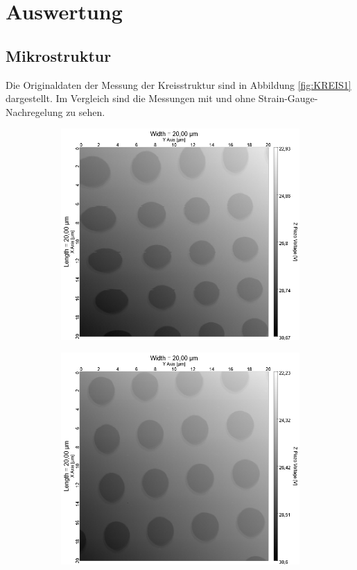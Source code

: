 \newpage
\section{Auswertung}
\label{sec:evaluation}
\subsection{Mikrostruktur}
Die Originaldaten der Messung der Kreisstruktur sind in Abbildung \ref{fig:KREIS1} dargestellt. 
Im Vergleich sind die Messungen mit und ohne Strain-Gauge-Nachregelung zu sehen.

\begin{figure}[H]
    \centering
    \begin{subfigure}{0.49\textwidth}
        \includegraphics[width=\textwidth]{bilder/Mikrostruktur/Kreis2_Res250px_Speed100pps_ohne_Nachregelung_withscale.png}
        \caption{}
        \label{fig:A1}
    \end{subfigure}
    \begin{subfigure}{0.49\textwidth}
        \includegraphics[width=\textwidth]{bilder/Mikrostruktur/Kreis2_Res250px_Speed100pps_withscale.png}

\end{subfigure}
\end{figure}

